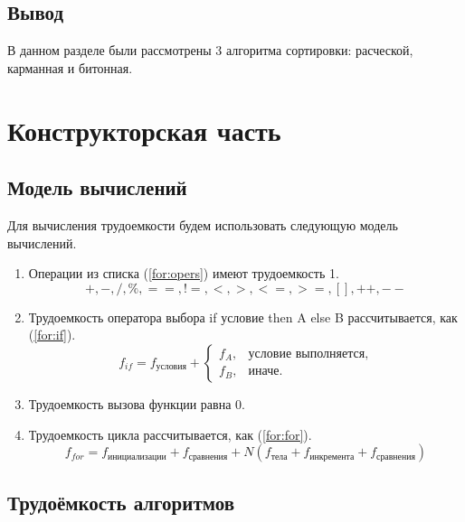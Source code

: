 \documentclass[12pt]{report}
\begin{document}
	\section*{Вывод}
	
	В данном разделе были рассмотрены 3 алгоритма сортировки: расческой, карманная и битонная.
	
	\clearpage
	
	\chapter{Конструкторская часть}
	
	\section{Модель вычислений}

	Для вычисления трудоемкости будем использовать следующую модель вычислений.

	\begin{enumerate}
		\item Операции из списка (\ref{for:opers}) имеют трудоемкость 1.
		\begin{equation}
		\label{for:opers}
		+, -, /, \%, ==, !=, <, >, <=, >=, [], ++, {-}-
		\end{equation}
		\item Трудоемкость оператора выбора if условие then A else B рассчитывается, как (\ref{for:if}).
		\begin{equation}
		\label{for:if}
		f_{if} = f_{\text{условия}} +
		\begin{cases}
		f_A, & \text{условие выполняется,}\\
		f_B, & \text{иначе.}
		\end{cases}
		\end{equation}
		\item Трудоемкость вызова функции равна 0.
		\item Трудоемкость цикла рассчитывается, как (\ref{for:for}).
		\begin{equation}
		\label{for:for}
		f_{for} = f_{\text{инициализации}} + f_{\text{сравнения}} + N(f_{\text{тела}} + f_{\text{инкремента}} + f_{\text{сравнения}})
		\end{equation}
	\end{enumerate}
	
	\section{Трудоёмкость алгоритмов}
\end{document}
